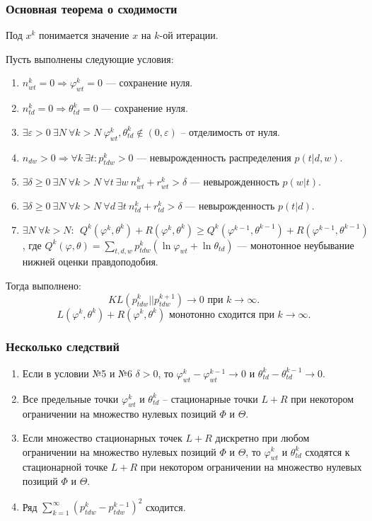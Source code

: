 \documentclass[utf8]{beamer}
\renewcommand{\geq}{\geqslant}
\renewcommand{\phi}{\varphi}
\begin{document}
\begin{frame}
\frametitle{Основная теорема о сходимости}
\footnotesize{
Под $x^k$ понимается значение $x$ на $k$-ой итерации. 

Пусть выполнены следующие условия:
\begin{enumerate}
\item  $ n^k_{wt} = 0 \Rightarrow \phi^k_{wt} = 0$ --- сохранение нуля.
\item $n^k_{td} = 0 \Rightarrow \theta^k_{td} = 0$ --- сохранение нуля.
\item $\exists \varepsilon>0\ \exists N\ \forall k > N\ \phi^k_{wt}, \theta^k_{td} \notin (0, \varepsilon)$ -- отделимость от нуля.
\item  $ n_{dw}>0 \Rightarrow \forall k\ \exists t\colon p^k_{tdw} > 0$ --- невырожденность распределения $ p(t|d,w)$.
\item $\exists \delta\geq 0\ \exists N\ \forall k > N \ \forall t\ \exists w\  n^k_{wt} + r^k_{wt} > \delta$ --- невырожденность $p(w|t)$.
\item $\exists \delta\geq 0\ \exists N\ \forall k > N \ \forall d\ \exists t\  n^k_{td} + r^k_{td} > \delta$ --- невырожденность $p(t|d)$.
\item $\exists N\ \forall k > N\colon\ \ Q^k (\phi^k, \theta^k)+ R(\phi^k, \theta^k) \geq Q^k(\phi^{k-1}, \theta^{k-1}) + R(\phi^{k-1}, \theta^{k-1})$, где $Q^k(\phi, \theta) = \sum\limits_{t,d,w} p^k_{tdw} (\ln \phi_{wt} + \ln \theta_{td})$ ---  монотонное неубывание нижней оценки правдоподобия.
\end{enumerate}
Тогда выполнено:
\[
KL(p_{tdw}^{k}||p_{tdw}^{k + 1}) \to 0 \text{ при } k \to \infty.
\]
\[
L(\phi^k, \theta^k) + R(\phi^k, \theta^k) \text{ монотонно сходится при } k \to \infty.
\]
}
\end{frame}

\begin{frame}
\frametitle{Несколько следствий}
\begin{enumerate}
\item  Если в условии №5 и №6 $\delta > 0$, то $\phi^k_{wt} - \phi_{wt}^{k-1} \to 0$ и $\theta^k_{td} - \theta^{k-1}_{td} \to 0$.
\item Все предельные точки $\phi^k_{wt}$ и $\theta^k_{td}$ -- стационарные точки $L + R$ при некотором ограничении на множество нулевых позиций $\Phi$ и $\Theta$.
\item Если множество стационарных точек $L + R$ дискретно при любом ограничении на множество нулевых позиций $\Phi$ и $\Theta$, то $\phi_{wt}^k$ и $\theta_{td}^k$ сходятся к стационарной точке $L+R$ при некотором ограничении  на множество нулевых позиций $\Phi$ и $\Theta$.
\item Ряд $\sum\limits_{k=1}^{\infty} (p_{tdw}^k - p_{tdw}^{k-1})^2$ сходится.
\end{enumerate}
\end{frame}
	
\end{document}

